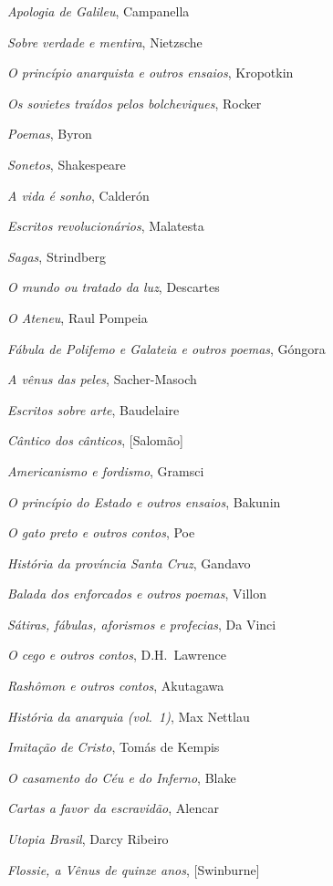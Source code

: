\begin{enumerate}
{\item \textit{Apologia de Galileu}, Campanella 
\item \textit{Sobre verdade e mentira}, Nietzsche
\item \textit{O princípio anarquista e outros ensaios}, Kropotkin
\item \textit{Os sovietes traídos pelos bolcheviques}, Rocker
\item \textit{Poemas}, Byron
\item \textit{Sonetos}, Shakespeare
\item \textit{A vida é sonho}, Calderón
\item \textit{Escritos revolucionários}, Malatesta
\item \textit{Sagas}, Strindberg
\item \textit{O mundo ou tratado da luz}, Descartes
\item \textit{O Ateneu}, Raul Pompeia
\item \textit{Fábula de Polifemo e Galateia e outros poemas}, Góngora
\item \textit{A vênus das peles}, Sacher{}-Masoch
\item \textit{Escritos sobre arte}, Baudelaire
\item \textit{Cântico dos cânticos}, [Salomão]
\item \textit{Americanismo e fordismo}, Gramsci
\item \textit{O princípio do Estado e outros ensaios}, Bakunin
\item \textit{O gato preto e outros contos}, Poe
\item \textit{História da província Santa Cruz}, Gandavo
\item \textit{Balada dos enforcados e outros poemas}, Villon
\item \textit{Sátiras, fábulas, aforismos e profecias}, Da Vinci
\item \textit{O cego e outros contos}, D.H.~Lawrence
\item \textit{Rashômon e outros contos}, Akutagawa
\item \textit{História da anarquia (vol.~1)}, Max Nettlau
\item \textit{Imitação de Cristo}, Tomás de Kempis
\item \textit{O casamento do Céu e do Inferno}, Blake
\item \textit{Cartas a favor da escravidão}, Alencar
\item \textit{Utopia Brasil}, Darcy Ribeiro
\item \textit{Flossie, a Vênus de quinze anos}, [Swinburne]
}
\end{enumerate}
